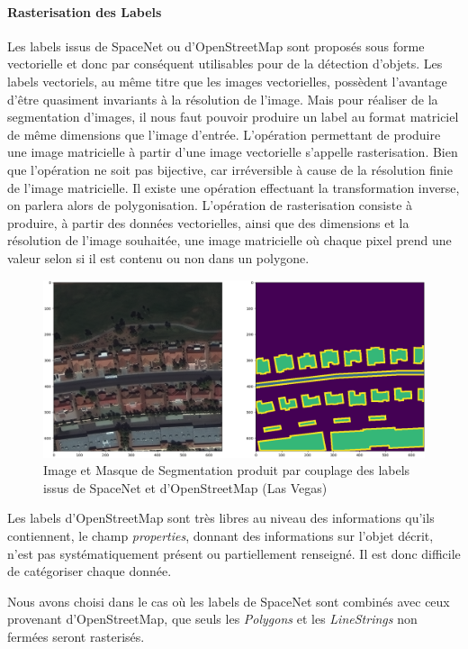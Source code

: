 \documentclass[a4paper, 11pt]{report}
\begin{document}
\paragraph{Rasterisation des Labels}
Les labels issus de SpaceNet ou d'OpenStreetMap sont proposés sous forme vectorielle et donc par conséquent utilisables pour de la détection d'objets.
Les labels vectoriels, au même titre que les images vectorielles, possèdent l'avantage d'être quasiment invariants à la résolution de l'image.
Mais pour réaliser de la segmentation d'images, il nous faut pouvoir produire un label au format matriciel de même dimensions que l'image d'entrée.
L'opération permettant de produire une image matricielle à partir d'une image vectorielle s'appelle rasterisation. Bien que l'opération ne soit pas bijective, car irréversible à cause de la résolution finie de l'image matricielle. Il existe une opération effectuant la transformation inverse, on parlera alors de polygonisation.
L'opération de rasterisation consiste à produire, à partir des données vectorielles, ainsi que des dimensions et la résolution de l'image souhaitée, une image matricielle où chaque pixel prend une valeur selon si il est contenu ou non dans un polygone.
\begin{figure}[H]
	\centering
	\includegraphics[scale=0.3]{Images/MUL_PAN_Label_Vegas.png}
	\caption{Image et Masque de Segmentation produit par couplage des labels issus de SpaceNet et d'OpenStreetMap (Las Vegas)}
\end{figure}
Les labels d'OpenStreetMap sont très libres au niveau des informations qu'ils contiennent, le champ \emph{properties}, donnant des informations sur l'objet décrit, n'est pas systématiquement présent ou partiellement renseigné. Il est donc difficile de catégoriser chaque donnée.

Nous avons choisi dans le cas où les labels de SpaceNet sont combinés avec ceux provenant d'OpenStreetMap, que seuls les \emph{Polygons} et les \emph{LineStrings} non fermées seront rasterisés.
\end{document}
